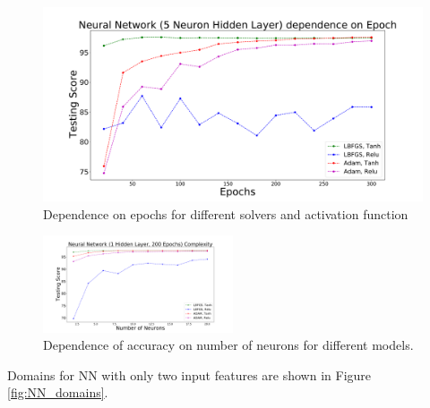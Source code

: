 \begin{figure}[h]
\includegraphics[width=\onepic\textwidth]{plots/nn_assoc_four.pdf}
\caption{
Dependence on epochs for different solvers and activation function
}
\label{fig:NN_epochs}
\end{figure}



\begin{figure}[h]
\includegraphics[width=0.5\textwidth]{plots/neurons3.pdf}
\caption{Dependence of accuracy on number of neurons for different models.
}
\label{fig:NN_neurons}
\end{figure}

Domains for NN with only two input features are shown in Figure \ref{fig:NN_domains}.


